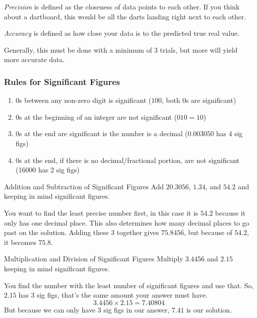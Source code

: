 \begin{definition}[Precision] \label{def:Precision}
  \emph{Precision} is defined as the closeness of data points to each other.
  If you think about a dartboard, this would be all the darts landing right next to each other.
\end{definition}

\begin{definition}[Accuracy] \label{def:Accuracy}
  \emph{Accuracy} is defined as how close your data is to the predicted true real value.
  \begin{remark}
    Generally, this must be done with a minimum of 3 trials, but more will yield more accurate data.
  \end{remark}
\end{definition}

\subsubsection{Rules for Significant Figures} \label{subsec:Rules for Sig Figs}
\begin{enumerate}
\item 0s between any non-zero digit is significant ($100$, both 0s are significant)
\item 0s at the beginning of an integer are not significant ($010 = 10$)
\item 0s at the end are significant is the number is a decimal (0.003050 has 4 sig figs)
\item 0s at the end, if there is no decimal/fractional portion, are not significant (16000 has 2 sig figs)
\end{enumerate}

\begin{example}[]{Addition and Subtraction of Significant Figures}
  Add $20.3056$, $1.34$, and $54.2$ and keeping in mind significant figures.

  \tcblower

  You want to find the least precise number first, in this case it is $54.2$ because it only has one decimal place.
  This also determines how many decimal places to go past on the solution.
  Adding these 3 together gives $75.8456$, but because of $54.2$, it becomes $75.8$.
\end{example}

\begin{example}[]{Multiplication and Division of Significant Figures}
  Multiply $3.4456$ and $2.15$ keeping in mind significant figures.

  \tcblower

  You find the number with the least number of significant figures and use that.
  So, $2.15$ has 3 sig figs, that's the same amount your answer must have.
  \[ 3.4456 \times 2.15 = 7.40804 \]
  But because we can only have 3 sig figs in our answer, $7.41$ is our solution.
\end{example}
